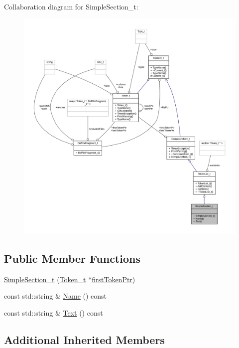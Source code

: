 Collaboration diagram for Simple\+Section\+\_\+t\+:
\nopagebreak
\begin{figure}[H]
\begin{center}
\leavevmode
\includegraphics[width=350pt]{struct_simple_section__t__coll__graph}
\end{center}
\end{figure}
\subsection*{Public Member Functions}
\begin{DoxyCompactItemize}
\item 
\hyperlink{struct_simple_section__t_a4862015e118a9f04ff783fbbb3d908f7}{Simple\+Section\+\_\+t} (\hyperlink{struct_token__t}{Token\+\_\+t} $\ast$\hyperlink{struct_compound_item__t_a4d95dc788120f627e332491589d20c5c}{first\+Token\+Ptr})
\item 
const std\+::string \& \hyperlink{struct_simple_section__t_a28e822a4f6a1200e6d18689a28fb27f6}{Name} () const 
\item 
const std\+::string \& \hyperlink{struct_simple_section__t_ade756200faceff193bd926c27f826d98}{Text} () const 
\end{DoxyCompactItemize}
\subsection*{Additional Inherited Members}


